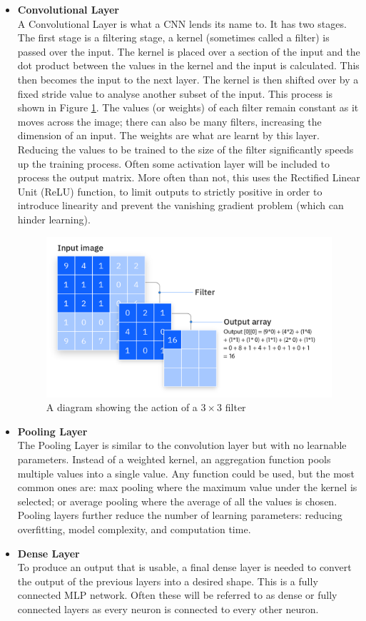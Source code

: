 \begin{itemize}
    \item \textbf{Convolutional Layer}\\
    A Convolutional Layer is what a CNN lends its name to. It has two stages. The first stage is a filtering stage, a kernel (sometimes called a filter) is passed over the input. The kernel is placed over a section of the input and the dot product between the values in the kernel and the input is calculated. This then becomes the input to the next layer. The kernel is then shifted over by a fixed stride value to analyse another subset of the input. This process is shown in Figure \ref{fig:filter}. The values (or weights) of each filter remain constant as it moves across the image; there can also be many filters, increasing the dimension of an input. The weights are what are learnt by this layer. Reducing the values to be trained to the size of the filter significantly speeds up the training process. Often some activation layer will be included to process the output matrix. More often than not, this uses the Rectified Linear Unit (ReLU) function, to limit outputs to strictly positive in order to introduce linearity and prevent the vanishing gradient problem (which can hinder learning)\cite{ibmconvolutional}.
    
    \begin{figure}[H]
        \centering
        \includegraphics[width=0.5\linewidth]{dissertation//figures/cnn-filter.png}
        \caption{A diagram showing the action of a $3 \times 3$ filter\cite{ibmconvolutional}}
        \label{fig:filter}
    \end{figure}

    \item \textbf{Pooling Layer}\\
    The Pooling Layer is similar to the convolution layer but with no learnable parameters. Instead of a weighted kernel, an aggregation function pools multiple values into a single value\cite{o2015introduction}. Any function could be used, but the most common ones are: max pooling where the maximum value under the kernel is selected; or average pooling where the average of all the values is chosen. Pooling layers further reduce the number of learning parameters: reducing overfitting, model complexity, and computation time\cite{ibmconvolutional}.

    \item \textbf{Dense Layer}\\
    To produce an output that is usable, a final dense layer is needed to convert the output of the previous layers into a desired shape. This is a fully connected MLP network. Often these will be referred to as dense or fully connected layers as every neuron is connected to every other neuron.
\end{itemize}

